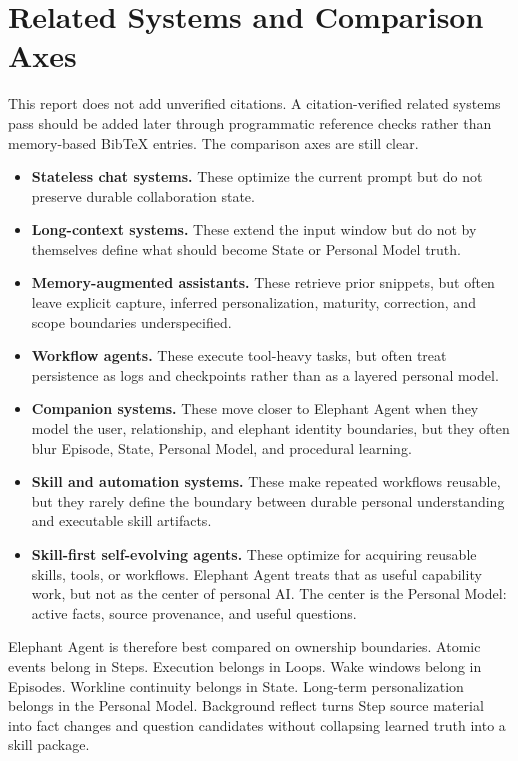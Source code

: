 \section{Related Systems and Comparison Axes}
\label{sec:related-systems}

This report does not add unverified citations. A citation-verified related
systems pass should be added later through programmatic reference checks rather
than memory-based BibTeX entries. The comparison axes are still clear.

\begin{itemize}[leftmargin=*]
  \item \textbf{Stateless chat systems.} These optimize the current prompt but
  do not preserve durable collaboration state.

  \item \textbf{Long-context systems.} These extend the input window but do not
  by themselves define what should become State or Personal Model truth.

  \item \textbf{Memory-augmented assistants.} These retrieve prior snippets,
  but often leave explicit capture, inferred personalization, maturity,
  correction, and scope boundaries underspecified.

  \item \textbf{Workflow agents.} These execute tool-heavy tasks, but often
  treat persistence as logs and checkpoints rather than as a layered personal
  model.

  \item \textbf{Companion systems.} These move closer to Elephant Agent when they model
  the user, relationship, and elephant identity boundaries, but they often blur
  Episode, State, Personal Model, and procedural learning.

  \item \textbf{Skill and automation systems.} These make repeated workflows
  reusable, but they rarely define the boundary between durable personal
  understanding and executable skill artifacts.

  \item \textbf{Skill-first self-evolving agents.} These optimize for acquiring
  reusable skills, tools, or workflows. Elephant Agent treats that as useful capability
  work, but not as the center of personal AI. The center is the Personal Model:
  active facts, source provenance, and useful questions.
\end{itemize}

Elephant Agent is therefore best compared on ownership boundaries. Atomic events belong
in Steps. Execution belongs in Loops. Wake windows belong in Episodes.
Workline continuity belongs in State. Long-term personalization belongs in the
Personal Model. Background reflect turns Step source material into fact changes
and question candidates without collapsing learned truth into a skill package.
